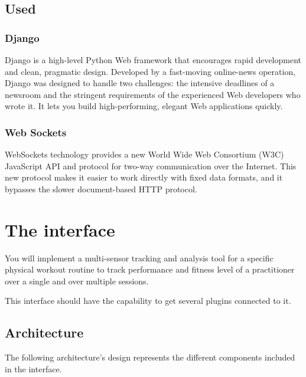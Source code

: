 \documentclass[a4paper]{article}
\begin{document}
\subsection{Used}

\subsubsection{Django}
Django is a high-level Python Web framework that encourages rapid development and clean, pragmatic design. Developed by a fast-moving online-news operation, Django was designed to handle two challenges: the intensive deadlines of a newsroom and the stringent requirements of the experienced Web developers who wrote it. It lets you build high-performing, elegant Web applications quickly.

\subsubsection{Web Sockets}
WebSockets technology provides a new World Wide Web Consortium (W3C) JavaScript API and protocol for two-way communication over the Internet. This new protocol makes it easier to work directly with fixed data formats, and it bypasses the slower document-based HTTP protocol.

\section{The interface}
You will implement a multi-sensor tracking and analysis tool for a specific physical workout routine to track performance and fitness level of a practitioner over a single and over multiple sessions.

This interface should have the capability to get several plugins connected to it.

\subsection{Architecture}
The following architecture's design represents the different components included in the interface.
\newpage
\end{document}
